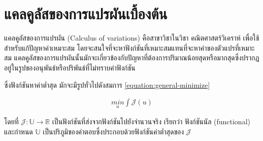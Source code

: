 \section{แคลคูลัสของการแปรผันเบื้องต้น}

\hspace{1cm} แคลคูลัสของการแปรผัน (Calculus of variations) คือสาขาวิชาในวิชา คณิตศาสตร์วิเคราห์ เพื่อใช้สำหรับแก้ปัญหาค่าเหมาะสม โดยจะสนใจที่จะหาฟังก์ชันที่เหมาะสมแทนที่จะหาค่าของตัวแปรที่เหมาะสม แคลคูลัสของการแปรผันนั้นมักจะเกี่ยวข้องกับปัญหาที่ต้องการปริมาณน้อยสุดหรือมากสุดซึ่งปรากฏอยู่ในรูปของอนุพันธ์หรือปริพันธ์ที่ไม่ทราบค่าฟังก์ชัน

\hspace{1cm}ซึ่งฟังก์ชันหาค่าต่ำสุด มักจะมีรูปทั่วไปดังสมการ  \ref{equation:general-minimize} 

\begin{align}
    \underset{u}{{min}} \int \mathcal{J}(u)
    \label{equation:general-minimize}
\end{align}

โดยที่ $\mathcal{J} : \mathbb{U} \rightarrow \mathbb{R} $ เป็นฟังก์ชันที่ส่งจากฟังก์ชันไปยังจำนวนจริง เรียกว่า ฟังก์ชันนัล (functional) และกำหนด $\mathbb{U}$ เป็นปริภูมิของคำตอบซึ่งประกอบด้วยฟังก์ชันค่าต่ำสุดของ $\mathcal{J}$ 

